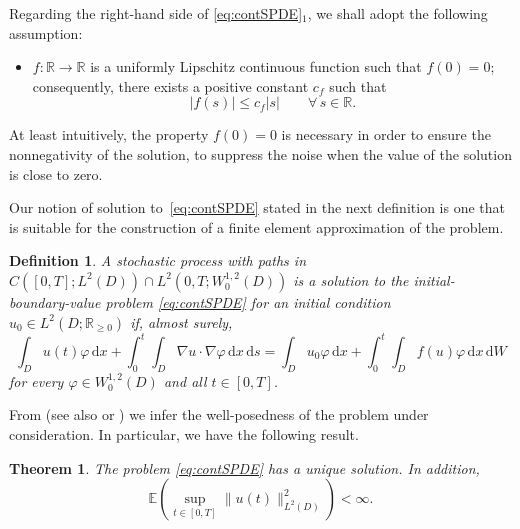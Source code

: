 \documentclass[12pt]{article}
\newtheorem{theorem}{Theorem}[section]
\newtheorem{definition}{Definition}[section]
\newcommand{\dd}{\,\mathrm{d}}
\begin{document}
Regarding the right-hand side
of \eqref{eq:contSPDE}$_1$, we shall adopt the following assumption:
%
\begin{itemize}
\item[(c)] $f : \mathbb{R} \to \mathbb{R}$ is a uniformly Lipschitz continuous function such that $f(0)=0$; consequently, there exists a positive constant $c_f$ such that
\begin{equation}\label{eq:f}
    |f(s)| \leq c_f |s|\qquad \forall\, s \in \mathbb{R}.
\end{equation}
\end{itemize}

At least intuitively, the property $f(0) = 0$ is necessary in order to ensure the nonnegativity of the solution, to suppress the noise when the value of the solution is close to zero.

Our notion of solution to~\eqref{eq:contSPDE} stated in the next definition is one that is suitable for the construction of a finite element approximation of the problem.

\begin{definition}
A stochastic process with paths in $C([0,T];L^2(D)) \cap L^2(0,T; W^{1,2}_0(D))$ is a solution to the initial-boundary-value problem \eqref{eq:contSPDE}
for an initial condition~$u_0 \in L^2(D; \mathbb{R}_{\geq 0})$ if, almost surely,  
\begin{equation}\label{eq:continous}
    \int_D u(t) \varphi \dd x + \int_0^t \int_{D} \nabla u \cdot \nabla \varphi \dd x \dd s 
    = \int_D u_0 \varphi \dd x+ 
    \int_0^t \int_{D} f(u)  \varphi \dd x \dd W
\end{equation}
for every $\varphi \in W^{1,2}_0(D)$ and all $t \in [0,T]$.
\end{definition}


From \cite[Theorem 5.1.3]{liu2015stochastic} (see also \cite[Theorem 2.2]{gyongy2009rate} or \cite[Theorem 6.7]{da2014stochastic}) we infer the well-posedness of the problem under consideration. In particular, we have the following result.
 \begin{theorem}
     The problem \eqref{eq:contSPDE} has a unique solution. In addition, 
     \begin{equation}\label{energy_estimate_u}
         \mathbb{E} \left( \sup_{t \in [0,T]} \| u(t) \|^2_{L^2(D)}\right) < \infty.
     \end{equation}
 \end{theorem}
\end{document}
